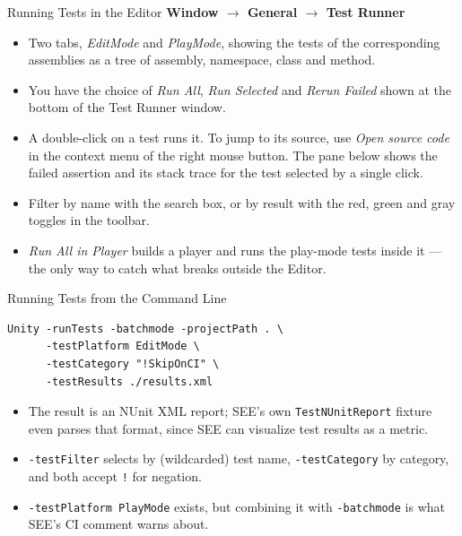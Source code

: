 \begin{frame}{Running Tests in the Editor}
  \textbf{Window \(\rightarrow\) General \(\rightarrow\) Test Runner}
  \vspace{1ex}

  \begin{itemize}
    \item Two tabs, \emph{EditMode} and \emph{PlayMode}, showing the tests of
      the corresponding assemblies as a tree of assembly, namespace, class and
      method.
    \item You have the choice of \emph{Run All}, \emph{Run Selected} and \emph{Rerun Failed}
    shown at the bottom of the Test Runner window.
    \item A double-click on a test runs it. To jump to its source, use
      \emph{Open source code} in the context menu of the right mouse button.
      The pane below shows the failed assertion and its stack trace for the test
      selected by a single click.
    \item Filter by name with the search box, or by result with the red, green
      and gray toggles in the toolbar.
    \item \emph{Run All in Player} builds a player and runs the play-mode tests
      inside it --- the only way to catch what breaks outside the Editor.
  \end{itemize}
  \vspace{1ex}

\end{frame}

\begin{frame}[fragile]{Running Tests from the Command Line}
  \begin{lstlisting}[language={},basicstyle=\scriptsize\ttfamily]
Unity -runTests -batchmode -projectPath . \
      -testPlatform EditMode \
      -testCategory "!SkipOnCI" \
      -testResults ./results.xml
  \end{lstlisting}
  \vspace{1ex}

  \begin{itemize}
    \item The result is an NUnit XML report; SEE's own
      \texttt{TestNUnitReport} fixture even parses that format, since SEE can
      visualize test results as a metric.
    \item \texttt{-testFilter} selects by (wildcarded) test name,
      \texttt{-testCategory} by category, and both accept \texttt{!} for
      negation.
    \item \texttt{-testPlatform PlayMode} exists, but combining it with
      \texttt{-batchmode} is what SEE's CI comment warns about.
  \end{itemize}
  \vspace{2ex}

\end{frame}

